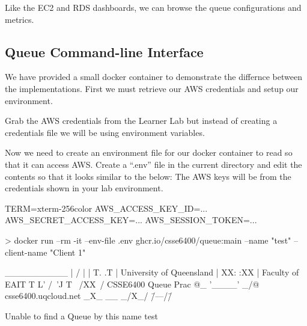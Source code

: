 \documentclass{csse4400}
\begin{document}
Like the EC2 and RDS dashboards,
we can browse the queue configurations and metrics.
  

\subsection{Queue Command-line Interface}

We have provided a small docker container to demonstrate the differnce between the implementations.
First we must retrieve our AWS credentials and setup our environment.

Grab the AWS credentials from the Learner Lab but instead of creating a credentials file we will be using environment variables.

Now we need to create an environment file for our docker container to read so that it can access AWS. Create a ``.env'' file in the current directory and edit the contents so that it looks similar to the below: The AWS keys will be from the credentials shown in your lab environment.

\begin{code}[numbers=none]{}
TERM=xterm-256color
AWS_ACCESS_KEY_ID=...
AWS_SECRET_ACCESS_KEY=...
AWS_SESSION_TOKEN=...
\end{code}

\begin{code}[numbers=none,keepspaces=true]{}
> docker run --rm -it --env-file .env ghcr.io/csse6400/queue:main --name "test" --client-name "Client 1"


  __________
 |   \XX/   |
 | T. \/ .T |      University of Queensland
 | XX:  :XX |          Faculty of EAIT
 T L' /\ 'J T
  \  /XX\  /         CSSE6400 Queue Prac
@\_ '____' _/@       csse6400.uqcloud.net
\_X\_ __ _/X_/
 \=/\----/\=/



Unable to find a Queue by this name test
\end{code}
\end{document}
